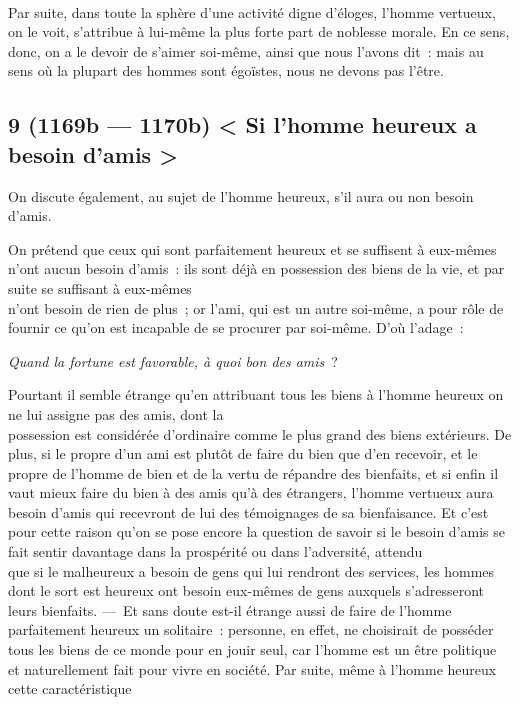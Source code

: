 \documentclass[french,twoside]{book} %
\begin{document}
\\
Par suite, dans toute la sphère d’une activité digne d’éloges, l’homme vertueux, on le voit, s’attribue à lui-même  la plus forte part de noblesse morale. En ce sens, donc, on a le devoir de s’aimer soi-même, ainsi que nous l’avons dit : mais au sens où la plupart des hommes sont égoïstes, nous ne devons pas l’être.
\subsection[{9 (1169b — 1170b) < Si l’homme heureux a besoin d’amis >}]{9 (1169b — 1170b) < Si l’homme heureux a besoin d’amis >}
\noindent On discute également, au sujet de l’homme heureux, s’il aura ou non besoin d’amis.\par
On prétend que ceux qui sont parfaitement heureux et se suffisent à eux-mêmes n’ont aucun besoin d’amis : ils sont déjà en possession des biens de la vie, et par suite se suffisant à eux-mêmes \\
n’ont besoin de rien de plus ; or l’ami, qui est un autre soi-même, a pour rôle de fournir ce qu’on est incapable de se procurer par soi-même. D’où l’adage :\par
{\itshape Quand la fortune est favorable, à quoi bon des amis} ? \par
Pourtant il semble étrange qu’en attribuant tous les biens à l’homme heureux on ne lui assigne pas des amis, dont la \\
possession est considérée d’ordinaire comme le plus grand des biens extérieurs. De plus, si le propre d’un ami est plutôt de faire du bien que d’en recevoir, et le propre de l’homme de bien et de la vertu de répandre des bienfaits, et si enfin il vaut mieux faire du bien à des amis qu’à des étrangers, l’homme vertueux aura besoin d’amis qui recevront de lui des témoignages de sa bienfaisance. Et c’est pour cette raison qu’on se pose encore la question de savoir si le besoin d’amis se fait sentir davantage dans la prospérité ou dans l’adversité, attendu \\
que si le malheureux a besoin de gens qui lui rendront des services, les hommes dont le sort est heureux ont besoin eux-mêmes de gens auxquels s’adresseront leurs bienfaits. — Et sans doute est-il étrange aussi de faire de l’homme parfaitement heureux un solitaire : personne, en effet, ne choisirait de posséder tous les biens de ce monde pour en jouir seul, car l’homme est un être politique et naturellement fait pour vivre en société. Par suite, même à l’homme heureux cette caractéristique \\
\end{document}
